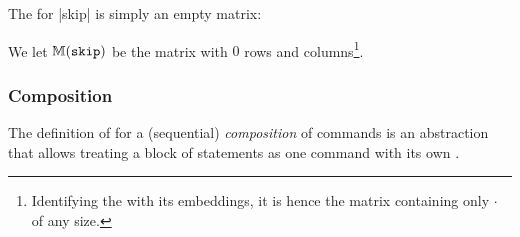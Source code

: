 \documentclass[conference]{IEEEtran}
\newcommand{\vi}{\usym{1F322}} %
\newcommand{\nv}{\cdot} %
\begin{document}
The \SFM for \prc|skip| is simply an empty matrix: %

\begin{definition}[Skip]
	We let $\mathbb{M}(\mathtt{\mathtt{skip}})$ be the matrix with $0$ rows and columns\footnote{Identifying the \SFM with its embeddings, it is hence the matrix containing only \(\nv\) of any size.}.
\end{definition}
%
%	
%

\subsubsection{Composition}%

The definition of \SFM for a (sequential) \emph{composition} of commands is an abstraction that allows treating a block of statements as one command with its own \SFM.
\end{document}
